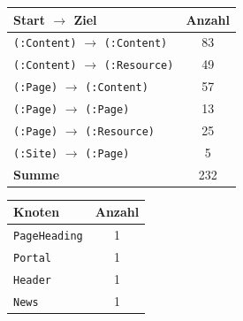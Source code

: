 \begin{table}[htb]
        \begin{subtable}[c]{0.5\textwidth}
            \centering
            \begin{tabular}{|l|c|}
                \hline
                \textbf{Start $\rightarrow$ Ziel} & \multicolumn{1}{l|}{\textbf{Anzahl}} \\ \hline
                \texttt{(:Content)} $\rightarrow$ \texttt{(:Content)}     & 83                                   \\ \hline
                \texttt{(:Content)} $\rightarrow$ \texttt{(:Resource)}    & 49                                   \\ \hline
                \texttt{(:Page)} $\rightarrow$ \texttt{(:Content)}        & 57                                   \\ \hline
                \texttt{(:Page)} $\rightarrow$ \texttt{(:Page)}           & 13                                   \\ \hline
                \texttt{(:Page)} $\rightarrow$ \texttt{(:Resource)}       & 25                                   \\ \hline
                \texttt{(:Site)} $\rightarrow$ \texttt{(:Page)}           & 5                                    \\ \hline
                \textbf{Summe}                    & 232                                  \\ \hline
            \end{tabular}
            \label{table:findingsNewsFiguresEdgesByStartEndNodeLabel}
        \end{subtable}
        \begin{subtable}[c]{0.5\textwidth}
            \centering
            \begin{tabular}{|l|c|}
                \hline
                \textbf{Knoten} & \multicolumn{1}{l|}{\textbf{Anzahl}} \\ \hline
                \texttt{PageHeading}     & 1                                    \\ \hline
                \texttt{Portal}          & 1                                    \\ \hline
                \texttt{Header}          & 1                                    \\ \hline
                \texttt{News}            & 1                                    \\ \hline

\end{tabular}
\end{subtable}
\end{table}
